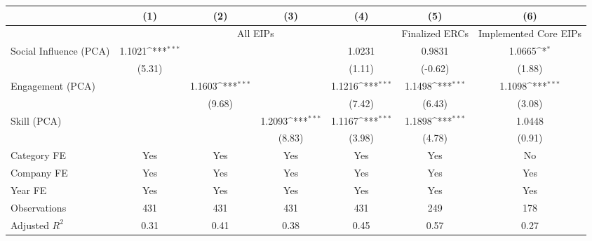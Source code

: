 {
\def\sym#1{\ifmmode^{#1}\else\(^{#1}\)\fi}
\begin{tabular}{l*{6}{c}}
\hline\hline
    &\multicolumn{1}{c}{(1)}         &\multicolumn{1}{c}{(2)}         &\multicolumn{1}{c}{(3)}         &\multicolumn{1}{c}{(4)}         &\multicolumn{1}{c}{(5)}         &\multicolumn{1}{c}{(6)}         \\
\hline
& \multicolumn{4}{c}{All EIPs} & Finalized ERCs & Implemented Core EIPs \\ \hline
Social Influence (PCA)       &      1.1021\sym{***}&                     &                     &      1.0231         &      0.9831         &      1.0665\sym{*}  \\
                                   &      (5.31)         &                     &                     &      (1.11)         &     (-0.62)         &      (1.88)         \\
[1em]
Engagement (PCA)             &                     &      1.1603\sym{***}&                     &      1.1216\sym{***}&      1.1498\sym{***}&      1.1098\sym{***}\\
                                   &                     &      (9.68)         &                     &      (7.42)         &      (6.43)         &      (3.08)         \\
[1em]
Skill (PCA)                  &                     &                     &      1.2093\sym{***}&      1.1167\sym{***}&      1.1898\sym{***}&      1.0448         \\
                                   &                     &                     &      (8.83)         &      (3.98)         &      (4.78)         &      (0.91)         \\
[1em]
Category FE                        &         Yes         &         Yes         &         Yes         &         Yes         &         Yes         &          No         \\
[1em]
Company FE                         &         Yes         &         Yes         &         Yes         &         Yes         &         Yes         &         Yes         \\
[1em]
Year FE                            &         Yes         &         Yes         &         Yes         &         Yes         &         Yes         &         Yes         \\
\hline
Observations                       &         431         &         431         &         431         &         431         &         249         &         178         \\
Adjusted \(R^{2}\)                 &        0.31         &        0.41         &        0.38         &        0.45         &        0.57         &        0.27         \\
\hline\hline
\end{tabular}
}
